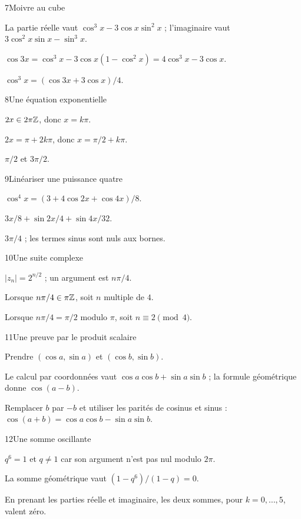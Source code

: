 \begin{corrige}{7}{Moivre au cube}
\begin{questions}
\item La partie réelle vaut $\cos^3x-3\cos x\sin^2x$ ; l’imaginaire vaut $3\cos^2x\sin x-\sin^3x$.
\item $\cos3x=\cos^3x-3\cos x(1-\cos^2x)=4\cos^3x-3\cos x$.
\item $\cos^3x=(\cos3x+3\cos x)/4$.
\end{questions}
\end{corrige}
\begin{corrige}{8}{Une équation exponentielle}
\begin{questions}
\item $2x\in2\pi\mathbb{Z}$, donc $x=k\pi$.
\item $2x=\pi+2k\pi$, donc $x=\pi/2+k\pi$.
\item $\pi/2$ et $3\pi/2$.
\end{questions}
\end{corrige}
\begin{corrige}{9}{Linéariser une puissance quatre}
\begin{questions}
\item $\cos^4x=(3+4\cos2x+\cos4x)/8$.
\item $3x/8+\sin2x/4+\sin4x/32$.
\item $3\pi/4$ ; les termes sinus sont nuls aux bornes.
\end{questions}
\end{corrige}
\begin{corrige}{10}{Une suite complexe}
\begin{questions}
\item $|z_n|=2^{n/2}$ ; un argument est $n\pi/4$.
\item Lorsque $n\pi/4\in\pi\mathbb{Z}$, soit $n$ multiple de $4$.
\item Lorsque $n\pi/4=\pi/2$ modulo $\pi$, soit $n\equiv2\pmod4$.
\end{questions}
\end{corrige}
\begin{corrige}{11}{Une preuve par le produit scalaire}
\begin{questions}
\item Prendre $(\cos a,\sin a)$ et $(\cos b,\sin b)$.
\item Le calcul par coordonnées vaut $\cos a\cos b+\sin a\sin b$ ; la formule géométrique donne $\cos(a-b)$.
\item Remplacer $b$ par $-b$ et utiliser les parités de cosinus et sinus : $\cos(a+b)=\cos a\cos b-\sin a\sin b$.
\end{questions}
\end{corrige}
\begin{corrige}{12}{Une somme oscillante}
\begin{questions}
\item $q^6=1$ et $q\ne1$ car son argument n’est pas nul modulo $2\pi$.
\item La somme géométrique vaut $(1-q^6)/(1-q)=0$.
\item En prenant les parties réelle et imaginaire, les deux sommes, pour $k=0,\ldots,5$, valent zéro.
\end{questions}
\end{corrige}
